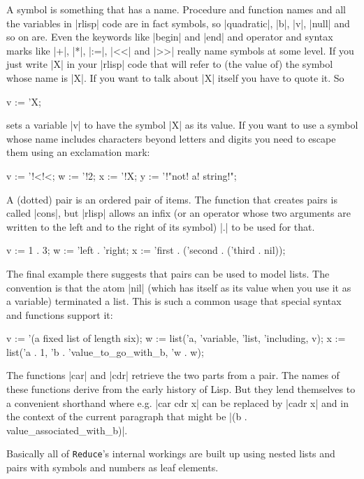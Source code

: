 \documentclass[12pt,twoside,openright]{memoir}
\newcommand{\reduce}{\texttt{Reduce}\xspace}
\begin{document}
\begin{enumerate}
A symbol is something that has a name. Procedure and function names and all
the variables in |rlisp| code are in fact symbols, so |quadratic|, |b|, |v|,
|null| and so on are. Even the keywords like |begin| and |end| and operator and
syntax marks like |+|, |*|, |:=|, |<<| and |>>| really name symbols at some
level. If you just write |X| in your |rlisp| code that will refer to (the value
of) the symbol whose name is |X|. If you want to talk about |X| itself you have
to quote it. So
\begin{rlispverb}
  v := 'X;
\end{rlispverb}
sets a variable |v| to have the symbol |X| as its value. If you want to use
a symbol whose name includes characters beyond letters and digits you need
to escape them using an exclamation mark:
\begin{rlispverb}
  v := '!<!<;   %
  w := '!2;    %
  x := '!X;    %
  y := '!"not! a! string!"; %
\end{rlispverb}
A (dotted) pair is an ordered pair of items. The function that creates pairs is
called |cons|, but |rlisp| allows an infix (or an operator whose two arguments
are written to the left and to the right of its symbol) |.| to be used for
that.
\begin{rlispverb}
  v := 1 . 3;  %
  w := 'left . 'right;
  x := 'first . ('second . ('third . nil));
\end{rlispverb}
The final example there suggests that pairs can be used to model lists.
The convention is that the atom |nil| (which has itself as its value when
you use it as a variable) terminated a list. This is such a common usage
that special syntax and functions support it:
\begin{rlispverb}
  v := '(a fixed list of length six);
  w := list('a, 'variable, 'list, 'including, v);
  x := list('a . 1, 'b . 'value_to_go_with_b, 'w . w);
\end{rlispverb}
The functions |car| and |cdr| retrieve the two parts from a pair. The names of
these functions derive from the early history of Lisp. But they lend themselves
to a convenient shorthand where e.g. |car cdr x| can be replaced by |cadr x|
and in the context of the current paragraph that might be
|(b . value_associated_with_b)|.

Basically all of \reduce's internal workings are built up using nested
lists and pairs with symbols and numbers as leaf elements.
\end{enumerate}
\end{document}
